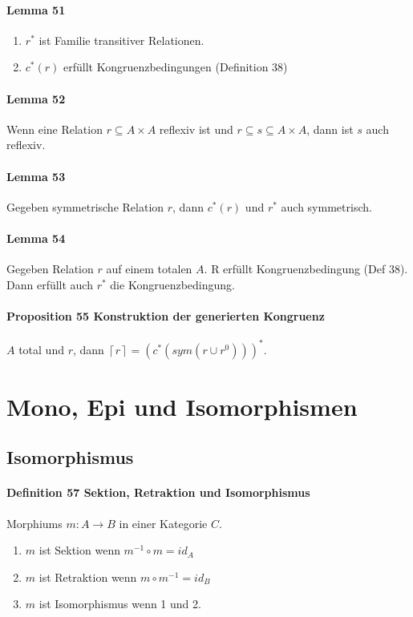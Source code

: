 \paragraph{Lemma 51}

\begin{enumerate}
\item $r^*$ ist Familie transitiver Relationen.
\item $c^*(r)$ erfüllt Kongruenzbedingungen (Definition 38)
\end{enumerate}


\paragraph{Lemma 52}
Wenn eine Relation $r\subseteq A\times A$ reflexiv ist
und $r\subseteq s\subseteq A\times A$, dann ist $s$ auch reflexiv.


\paragraph{Lemma 53}
Gegeben symmetrische Relation $r$, dann $c^*(r)$ und $r^*$ auch symmetrisch.


\paragraph{Lemma 54}
Gegeben Relation $r$ auf einem totalen $A$. R erfüllt Kongruenzbedingung (Def 38). Dann erfüllt auch $r^*$ die Kongruenzbedingung.


\paragraph{Proposition 55 Konstruktion der generierten Kongruenz}
$A$ total und $r$, dann $\left\lceil r\right\rceil =\left(c^{*}\left(sym\left(r\cup r^{0}\right)\right)\right)^{*}$.

\section{Mono, Epi und Isomorphismen}

\subsection{Isomorphismus}

\paragraph{Definition 57 Sektion, Retraktion und Isomorphismus}
Morphiums $m: A \rightarrow B$ in einer Kategorie $C$.
\begin{enumerate}
\item$m$ ist Sektion wenn $m^{-1} \circ m = id_A$
\item$m$ ist Retraktion  wenn $m \circ m^{-1}  = id_B$
\item $m$ ist Isomorphismus wenn 1 und 2.
\end{enumerate}

